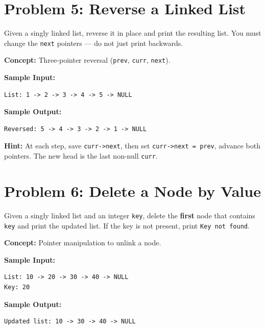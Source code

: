 \documentclass[12pt, a4paper]{article}
\begin{document}
\hrulefill

\section*{Problem 5: Reverse a Linked List}

\begin{problembox}
Given a singly linked list, reverse it in place and print the resulting list. You must change the \texttt{next} pointers --- do not just print backwards.
\end{problembox}

\textbf{Concept:} Three-pointer reversal (\texttt{prev}, \texttt{curr}, \texttt{next}).

\textbf{Sample Input:}
\begin{lstlisting}
List: 1 -> 2 -> 3 -> 4 -> 5 -> NULL
\end{lstlisting}

\textbf{Sample Output:}
\begin{lstlisting}
Reversed: 5 -> 4 -> 3 -> 2 -> 1 -> NULL
\end{lstlisting}

\textbf{Hint:} At each step, save \texttt{curr->next}, then set \texttt{curr->next = prev}, advance both pointers. The new head is the last non-null \texttt{curr}.

\hrulefill

\section*{Problem 6: Delete a Node by Value}

\begin{problembox}
Given a singly linked list and an integer \texttt{key}, delete the \textbf{first} node that contains \texttt{key} and print the updated list. If the key is not present, print \texttt{Key not found}.
\end{problembox}

\textbf{Concept:} Pointer manipulation to unlink a node.

\textbf{Sample Input:}
\begin{lstlisting}
List: 10 -> 20 -> 30 -> 40 -> NULL
Key: 20
\end{lstlisting}

\textbf{Sample Output:}
\begin{lstlisting}
Updated list: 10 -> 30 -> 40 -> NULL
\end{lstlisting}
\end{document}

